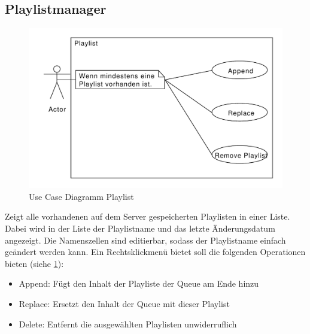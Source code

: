 \subsection{Playlistmanager}
\begin{figure}[htb!]
	\centering
        \includegraphics[width=\textwidth]{uc_playlist.pdf}
	\caption{Use Case Diagramm Playlist}
	\label{uc_playlist}
\end{figure}
Zeigt alle vorhandenen auf dem Server gespeicherten Playlisten in einer Liste.
Dabei wird in der Liste der Playlistname und das letzte Änderungsdatum angezeigt.
Die Namenszellen sind editierbar, sodass der Playlistname einfach geändert werden kann. 
Ein Rechtsklickmenü bietet soll die folgenden Operationen bieten (siehe \ref{uc_playlist}):
 \begin{itemize}
   \item Append: Fügt den Inhalt der Playliste der Queue am Ende hinzu
   \item Replace: Ersetzt den Inhalt der Queue mit dieser Playlist
   \item Delete: Entfernt die ausgewählten Playlisten unwiderruflich
 \end{itemize}   


